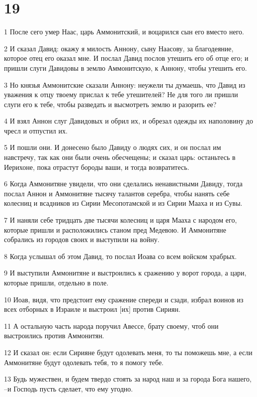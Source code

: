 \chapter{19}

\par 1 После сего умер Наас, царь Аммонитский, и воцарился сын его вместо него.
\par 2 И сказал Давид: окажу я милость Аннону, сыну Наасову, за благодеяние, которое отец его оказал мне. И послал Давид послов утешить его об отце его; и пришли слуги Давидовы в землю Аммонитскую, к Аннону, чтобы утешить его.
\par 3 Но князья Аммонитские сказали Аннону: неужели ты думаешь, что Давид из уважения к отцу твоему прислал к тебе утешителей? Не для того ли пришли слуги его к тебе, чтобы разведать и высмотреть землю и разорить ее?
\par 4 И взял Аннон слуг Давидовых и обрил их, и обрезал одежды их наполовину до чресл и отпустил их.
\par 5 И пошли они. И донесено было Давиду о людях сих, и он послал им навстречу, так как они были очень обесчещены; и сказал царь: останьтесь в Иерихоне, пока отрастут бороды ваши, и тогда возвратитесь.
\par 6 Когда Аммонитяне увидели, что они сделались ненавистными Давиду, тогда послал Аннон и Аммонитяне тысячу талантов серебра, чтобы нанять себе колесниц и всадников из Сирии Месопотамской и из Сирии Мааха и из Сувы.
\par 7 И наняли себе тридцать две тысячи колесниц и царя Мааха с народом его, которые пришли и расположились станом пред Медевою. И Аммонитяне собрались из городов своих и выступили на войну.
\par 8 Когда услышал об этом Давид, то послал Иоава со всем войском храбрых.
\par 9 И выступили Аммонитяне и выстроились к сражению у ворот города, а цари, которые пришли, отдельно в поле.
\par 10 Иоав, видя, что предстоит ему сражение спереди и сзади, избрал воинов из всех отборных в Израиле и выстроил [их] против Сириян.
\par 11 А остальную часть народа поручил Авессе, брату своему, чтоб они выстроились против Аммонитян.
\par 12 И сказал он: если Сирияне будут одолевать меня, то ты поможешь мне, а если Аммонитяне будут одолевать тебя, то я помогу тебе.
\par 13 Будь мужествен, и будем твердо стоять за народ наш и за города Бога нашего, --и Господь пусть сделает, что ему угодно.
